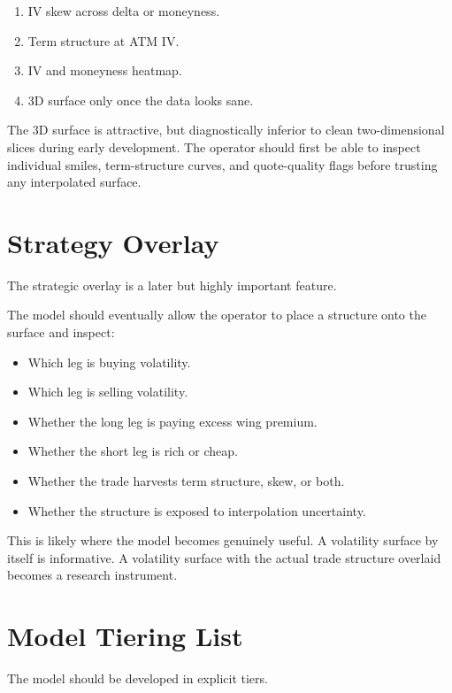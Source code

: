 \documentclass[11pt]{article}
\begin{document}
\begin{enumerate}[leftmargin=1.5em]
    \item IV skew across delta or moneyness.
    \item Term structure at ATM IV.
    \item IV and moneyness heatmap.
    \item 3D surface only once the data looks sane.
\end{enumerate}

The 3D surface is attractive, but diagnostically inferior to clean two-dimensional slices during early development. The operator should first be able to inspect individual smiles, term-structure curves, and quote-quality flags before trusting any interpolated surface.

\section{Strategy Overlay}

The strategic overlay is a later but highly important feature.

The model should eventually allow the operator to place a structure onto the surface and inspect:

\begin{itemize}[leftmargin=1.5em]
    \item Which leg is buying volatility.
    \item Which leg is selling volatility.
    \item Whether the long leg is paying excess wing premium.
    \item Whether the short leg is rich or cheap.
    \item Whether the trade harvests term structure, skew, or both.
    \item Whether the structure is exposed to interpolation uncertainty.
\end{itemize}

This is likely where the model becomes genuinely useful. A volatility surface by itself is informative. A volatility surface with the actual trade structure overlaid becomes a research instrument.

\section{Model Tiering List}

The model should be developed in explicit tiers.
\end{document}
